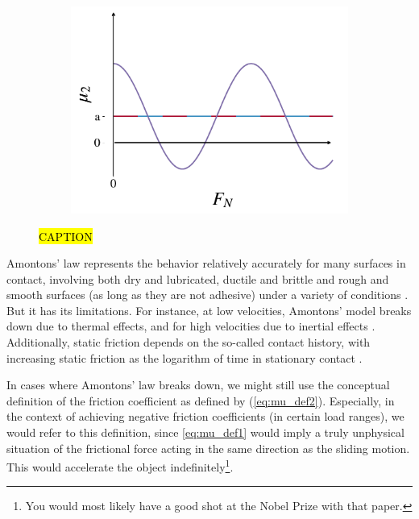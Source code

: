 \begin{figure}[H]
\begin{subfigure}[t]{0.32\textwidth}
      \caption{}
      \label{fig:fric_coef_example_b}
    \end{subfigure}
    \hfill
    \begin{subfigure}[t]{0.32\textwidth}
      \centering
      \includegraphics[width=\textwidth]{figures/theory/fric_coef_example_c.pdf}
      \caption{}
      \label{fig:fric_coef_example_c}
  \end{subfigure}
  \hfill
  \caption{\hl{CAPTION}}
  \label{fig:fric_coef_example}
\end{figure}

Amontons’ law represents the behavior relatively accurately for many surfaces in contact, involving both dry and lubricated, ductile and brittle and rough and smooth surfaces (as long as they are not adhesive) under a variety of conditions \cite{gao_frictional_2004}. But it has its limitations. For instance, at low velocities, Amontons' model breaks down due to thermal effects, and for high velocities due to inertial effects \cite[pp.\ 5--6]{gnecco_meyer_2015}. Additionally, static friction depends on the so-called contact history, with increasing static friction as the logarithm of time in stationary contact \cite{dieterich_1972}.

In cases where Amontons' law breaks down, we might still use the conceptual
definition of the friction coefficient as defined by (\cref{eq:mu_def2}).
Especially, in the context of achieving negative friction coefficients (in
certain load ranges), we would refer to this definition, since \cref{eq:mu_def1}
would imply a truly unphysical situation of the frictional force acting in the
same direction as the sliding motion. This would accelerate the object
indefinitely\footnote{You would most likely have a good shot at the Nobel Prize
with that paper.}.



